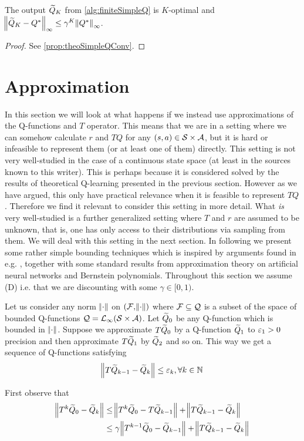 \begin{prop}
  The output $\widetilde{Q}_K$ from \cref{alg:finiteSimpleQ} is
  $K$-optimal and
  $\norm{\widetilde{Q}_K - Q^*}_\infty \leq \gamma^K \norm{Q^*}_\infty$.
\end{prop}
\begin{proof}
  See \cref{prop:theoSimpleQConv}.
\end{proof}

\section{Approximation}
In this section we will look at what happens if we
instead use approximations of the Q-functions and $T$ operator.
This means that we are in a setting where we can somehow
calculate $r$ and $TQ$ for any $(s,a) \in \mathcal{S} \times \mathcal{A}$,
but it is hard or infeasible to represent them (or at least one of them)
directly.
This setting is not very well-studied in the case of a
continuous state space (at least in the sources known to this writer).
This is perhaps because it is considered solved
by the results of theoretical Q-learning presented in the previous section.
However as we have argued, this only have practical relevance 
when it is feasible to represent $TQ$.
Therefore we find it relevant to consider this setting in more detail.
What \emph{is} very well-studied is a further generalized setting
where $T$ and $r$ are assumed to be unknown,
that is, one has only access to their distributions via sampling from them.
We will deal with this setting in the next section.
In following we present some rather simple bounding techniques
which is inspired by arguments found in e.g. ,
together with some standard results from approximation theory
on artificial neural networks and Bernstein polynomials.
Throughout this section we assume (D)
i.e. that we are discounting with some $\gamma \in [0,1)$.

Let us consider any norm $\norm{\cdot}$ on
$(\mathcal{F}, \norm{\cdot})$ where $\mathcal{F} \subseteq \mathcal{Q}$ is
a subset of the space of bounded
Q-functions $\mathcal{Q} = \mathcal{L}_\infty(\mathcal{S}\times\mathcal{A})$.
Let $\widetilde{Q}_0$ be any Q-function which is bounded in $\norm{\cdot}$.
Suppose we approximate $T\widetilde{Q}_0$ by a Q-function $\widetilde{Q}_1$
to $\varepsilon_1 > 0$ precision and then approximate $T\widetilde{Q}_1$ by $\widetilde{Q}_2$
and so on. This way we get a sequence of Q-functions satisfying
\[ \norm{T\widetilde{Q}_{k-1} - \widetilde{Q}_k} \leq \varepsilon_k, \forall k \in \mathbb{N} \]

First observe that
\begin{align*}
  \norm{T^k \widetilde{Q}_0 - \widetilde{Q}_k}
  &\leq \norm{T^k \widetilde{Q}_0 - T \widetilde{Q}_{k-1}} + \norm{T\widetilde{Q}_{k-1} - \widetilde{Q}_k}
  \\ &\leq \gamma \norm{T^{k-1} \widetilde{Q}_0 - \widetilde{Q}_{k-1}}
  + \norm{T\widetilde{Q}_{k-1} - \widetilde{Q}_k}
\end{align*}

